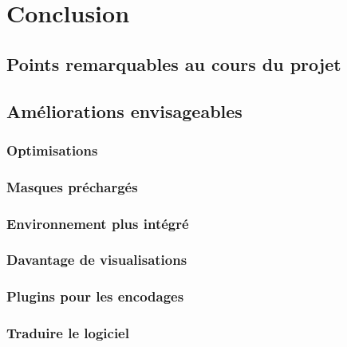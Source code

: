 \documentclass[a4paper,11pt]{article}
\begin{document}
\section{Conclusion}
  \subsection{Points remarquables au cours du projet}
  \subsection{Améliorations envisageables}
    \subsubsection{Optimisations}
    \subsubsection{ Masques préchargés}
    \subsubsection{Environnement plus intégré}
    \subsubsection{Davantage de visualisations}
    \subsubsection{Plugins pour les encodages}
    \subsubsection{Traduire le logiciel}

\end{document}
